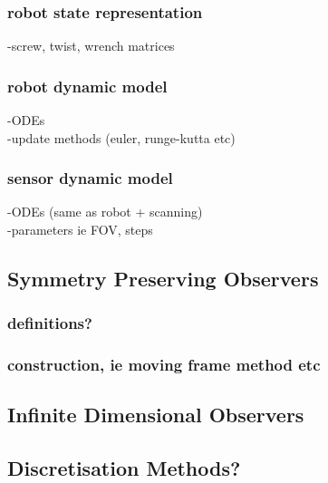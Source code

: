 	\subsubsection{robot state representation}	
		-screw, twist, wrench matrices
	\subsubsection{robot dynamic model}
		-ODEs\\
		-update methods (euler, runge-kutta etc)
	\subsubsection{sensor dynamic model}
		-ODEs (same as robot + scanning)\\
		-parameters ie FOV, steps
\subsection{Symmetry Preserving Observers}
	\subsubsection{definitions?}
	\subsubsection{construction, ie moving frame method etc}
\subsection{Infinite Dimensional Observers}
\subsection{Discretisation Methods?}